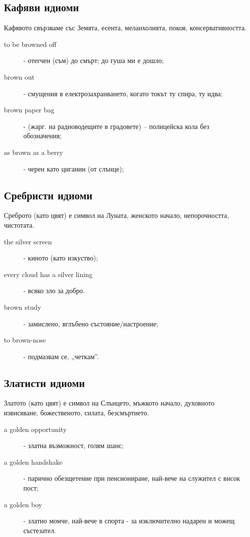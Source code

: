 \subsection{Кафяви идиоми}
Кафявото свързваме със Земята, есента, меланхолията, покоя, консервативността.

\begin{description}
     \item[to be browned off] - отегчен (съм) до смърт; до гуша ми е дошло;
    \item[brown out] - смущения в електрозахранването, когато токът ту спира, ту идва;
    \item[brown paper bag] - (жарг. на радиоводещите в градовете) – полицейска кола без обозначения;
    \item[as brown as a berry] - черен като циганин (от слънце);
\end{description}

\subsection{Сребристи идиоми}
Среброто (като цвят) е символ на Луната, женското начало, непорочността, чистотата.

\begin{description}
    \item[the silver screen] - киното (като изкуство);
\item[every cloud has a silver lining] - всяко зло за добро.
\item[brown study] - замислено, вглъбено състояние/настроение;
\item[to brown-nose] - подмазвам се, „четкам”.
\end{description}


\subsection{Златисти идиоми}
Златото (като цвят) е символ на Слънцето, мъжкото начало, духовното извисяване, божественото, силата, безсмъртието.

\begin{description}
     \item[a golden opportunity] - златна възможност, голям шанс;
    \item[a golden handshake] - парично обезщетение при пенсиониране, най-вече на служител с висок пост;
    \item[a golden boy] - златно момче, най-вече в спорта - за изключително надарен и можещ състезател.
\end{description}

